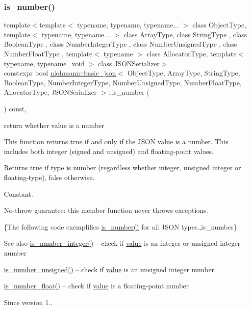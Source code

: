 \subsubsection{\texorpdfstring{is\+\_\+number()}{is\_number()}}
{\footnotesize\ttfamily template$<$template$<$ typename, typename, typename... $>$ class Object\+Type, template$<$ typename, typename... $>$ class Array\+Type, class String\+Type , class Boolean\+Type , class Number\+Integer\+Type , class Number\+Unsigned\+Type , class Number\+Float\+Type , template$<$ typename $>$ class Allocator\+Type, template$<$ typename, typename=void $>$ class J\+S\+O\+N\+Serializer$>$ \\
constexpr bool \hyperlink{classnlohmann_1_1basic__json}{nlohmann\+::basic\+\_\+json}$<$ Object\+Type, Array\+Type, String\+Type, Boolean\+Type, Number\+Integer\+Type, Number\+Unsigned\+Type, Number\+Float\+Type, Allocator\+Type, J\+S\+O\+N\+Serializer $>$\+::is\+\_\+number (\begin{DoxyParamCaption}{ }\end{DoxyParamCaption}) const\hspace{0.3cm}{\ttfamily [inline]}, {\ttfamily [noexcept]}}



return whether value is a number 

This function returns true if and only if the J\+S\+ON value is a number. This includes both integer (signed and unsigned) and floating-\/point values.

\begin{DoxyReturn}{Returns}
{\ttfamily true} if type is number (regardless whether integer, unsigned integer or floating-\/type), {\ttfamily false} otherwise.
\end{DoxyReturn}
Constant.

No-\/throw guarantee\+: this member function never throws exceptions.

\{The following code exemplifies {\ttfamily \hyperlink{classnlohmann_1_1basic__json_a2b9852390abb4b1ef5fac6984e2fc0f3}{is\+\_\+number()}} for all J\+S\+ON types.,is\+\_\+number\}

\begin{DoxySeeAlso}{See also}
\hyperlink{classnlohmann_1_1basic__json_abac8af76067f1e8fdca9052882c74428}{is\+\_\+number\+\_\+integer()} -- check if \hyperlink{classnlohmann_1_1basic__json_adcf8ca5079f5db993820bf50036bf45d}{value} is an integer or unsigned integer number 

\hyperlink{classnlohmann_1_1basic__json_abc7378cba0613a78b9aad1c8e7044bb0}{is\+\_\+number\+\_\+unsigned()} -- check if \hyperlink{classnlohmann_1_1basic__json_adcf8ca5079f5db993820bf50036bf45d}{value} is an unsigned integer number 

\hyperlink{classnlohmann_1_1basic__json_a33b4bf898b857c962e798fc7f6e86e70}{is\+\_\+number\+\_\+float()} -- check if \hyperlink{classnlohmann_1_1basic__json_adcf8ca5079f5db993820bf50036bf45d}{value} is a floating-\/point number
\end{DoxySeeAlso}
\begin{DoxySince}{Since}
version 1.. 
\end{DoxySince}


